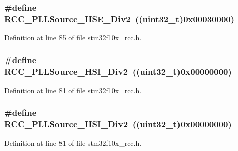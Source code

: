 \subsubsection[{\texorpdfstring{R\+C\+C\+\_\+\+P\+L\+L\+Source\+\_\+\+H\+S\+E\+\_\+\+Div2}{RCC_PLLSource_HSE_Div2}}]{\setlength{\rightskip}{0pt plus 5cm}\#define R\+C\+C\+\_\+\+P\+L\+L\+Source\+\_\+\+H\+S\+E\+\_\+\+Div2~(({\bf uint32\+\_\+t})0x00030000)}\hypertarget{group___p_l_l__entry__clock__source_ga24863bc670737a2f5abce546a49e620c}{}\label{group___p_l_l__entry__clock__source_ga24863bc670737a2f5abce546a49e620c}


Definition at line 85 of file stm32f10x\+\_\+rcc.\+h.

\subsubsection[{\texorpdfstring{R\+C\+C\+\_\+\+P\+L\+L\+Source\+\_\+\+H\+S\+I\+\_\+\+Div2}{RCC_PLLSource_HSI_Div2}}]{\setlength{\rightskip}{0pt plus 5cm}\#define R\+C\+C\+\_\+\+P\+L\+L\+Source\+\_\+\+H\+S\+I\+\_\+\+Div2~(({\bf uint32\+\_\+t})0x00000000)}\hypertarget{group___p_l_l__entry__clock__source_ga53194dd3e2986980b156a3e8e456df06}{}\label{group___p_l_l__entry__clock__source_ga53194dd3e2986980b156a3e8e456df06}


Definition at line 81 of file stm32f10x\+\_\+rcc.\+h.

\subsubsection[{\texorpdfstring{R\+C\+C\+\_\+\+P\+L\+L\+Source\+\_\+\+H\+S\+I\+\_\+\+Div2}{RCC_PLLSource_HSI_Div2}}]{\setlength{\rightskip}{0pt plus 5cm}\#define R\+C\+C\+\_\+\+P\+L\+L\+Source\+\_\+\+H\+S\+I\+\_\+\+Div2~(({\bf uint32\+\_\+t})0x00000000)}\hypertarget{group___p_l_l__entry__clock__source_ga53194dd3e2986980b156a3e8e456df06}{}\label{group___p_l_l__entry__clock__source_ga53194dd3e2986980b156a3e8e456df06}


Definition at line 81 of file stm32f10x\+\_\+rcc.\+h.

